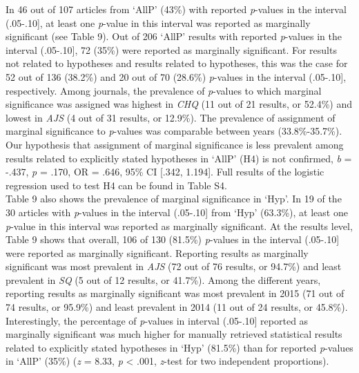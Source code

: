 \documentclass[
  12pt,
]{article}
\begin{document}
In 46 out of 107 articles from `AllP' (43\%) with reported
\emph{p}-values in the interval (.05-.10{]}, at least one \emph{p}-value
in this interval was reported as marginally significant (see Table 9).
Out of 206 `AllP' results with reported \emph{p}-values in the interval
(.05-.10{]}, 72 (35\%) were reported as marginally significant. For
results not related to hypotheses and results related to hypotheses,
this was the case for 52 out of 136 (38.2\%) and 20 out of 70 (28.6\%)
\emph{p}-values in the interval (.05-.10{]}, respectively. Among
journals, the prevalence of \emph{p}-values to which marginal
significance was assigned was highest in \emph{CHQ} (11 out of 21
results, or 52.4\%) and lowest in \emph{AJS} (4 out of 31 results, or
12.9\%). The prevalence of assignment of marginal significance to
\emph{p}-values was comparable between years (33.8\%-35.7\%). Our
hypothesis that assignment of marginal significance is less prevalent
among results related to explicitly stated hypotheses in `AllP' (H4) is
not confirmed, \emph{b} = -.437, \emph{p} = .170, OR = .646, 95\% CI
{[}.342, 1.194{]}. Full results of the logistic regression used to test
H4 can be found in Table S4.\\
\hspace*{0.333em}\hspace*{0.333em}\hspace*{0.333em}\hspace*{0.333em}Table
9 also shows the prevalence of marginal significance in `Hyp'. In 19 of
the 30 articles with \emph{p}-values in the interval (.05-.10{]} from
`Hyp' (63.3\%), at least one \emph{p}-value in this interval was
reported as marginally significant. At the results level, Table 9 shows
that overall, 106 of 130 (81.5\%) \emph{p}-values in the interval
(.05-.10{]} were reported as marginally significant. Reporting results
as marginally significant was most prevalent in \emph{AJS} (72 out of 76
results, or 94.7\%) and least prevalent in \emph{SQ} (5 out of 12
results, or 41.7\%). Among the different years, reporting results as
marginally significant was most prevalent in 2015 (71 out of 74 results,
or 95.9\%) and least prevalent in 2014 (11 out of 24 results, or
45.8\%).\\
\hspace*{0.333em}\hspace*{0.333em}\hspace*{0.333em}\hspace*{0.333em}Interestingly,
the percentage of \emph{p}-values in interval (.05-.10{]} reported as
marginally significant was much higher for manually retrieved
statistical results related to explicitly stated hypotheses in `Hyp'
(81.5\%) than for reported \emph{p}-values in `AllP' (35\%) (\emph{z} =
8.33, \emph{p} \textless{} .001, \emph{z}-test for two independent
proportions).
\end{document}
